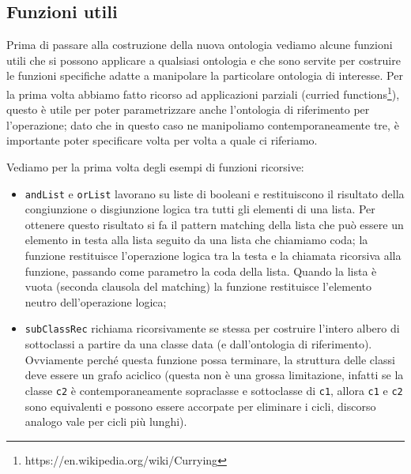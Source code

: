 \subsection{Funzioni utili}
Prima di passare alla costruzione della nuova ontologia vediamo alcune funzioni utili che si possono applicare a qualsiasi ontologia e che sono servite per costruire le funzioni specifiche adatte a manipolare la particolare ontologia di interesse.
Per la prima volta abbiamo fatto ricorso ad applicazioni parziali (curried functions\footnote{https://en.wikipedia.org/wiki/Currying}), questo è utile per poter parametrizzare anche l'ontologia di riferimento per l'operazione; dato che in questo caso ne manipoliamo contemporaneamente tre, è importante poter specificare volta per volta a quale ci riferiamo.

Vediamo per la prima volta degli esempi di funzioni ricorsive:
\begin{itemize}
	\item \verb|andList| e \verb|orList| lavorano su liste di booleani e restituiscono il risultato della congiunzione o disgiunzione logica tra tutti gli elementi di una lista. Per ottenere questo risultato si fa il pattern matching della lista che può essere un elemento in testa alla lista seguito da una lista che chiamiamo coda; la funzione restituisce l'operazione logica tra la testa e la chiamata ricorsiva alla funzione, passando come parametro la coda della lista. Quando la lista è vuota (seconda clausola del matching) la funzione restituisce l'elemento neutro dell'operazione logica;
	\item \verb|subClassRec| richiama ricorsivamente se stessa per costruire l'intero albero di sottoclassi a partire da una classe data (e dall'ontologia di riferimento). Ovviamente perché questa funzione possa terminare, la struttura delle classi deve essere un grafo aciclico (questa non è una grossa limitazione, infatti se la classe \verb|c2| è contemporaneamente sopraclasse e sottoclasse di \verb|c1|, allora \verb|c1| e \verb|c2| sono equivalenti e possono essere accorpate per eliminare i cicli, discorso analogo vale per cicli più lunghi).
\end{itemize}

